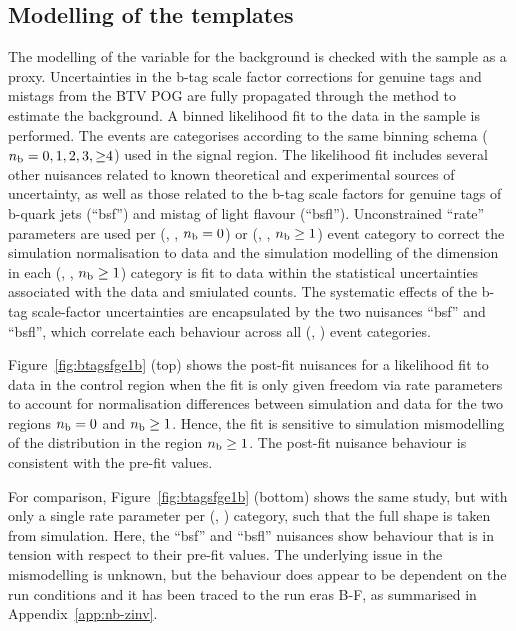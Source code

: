 \subsection{Modelling of the \texorpdfstring{\nb}{Nb} templates}
\label{sec:nb-zinv}

The modelling of the \nb variable for the \znunuj background is
checked with the \mmj sample as a proxy. Uncertainties in the b-tag
scale factor corrections for genuine tags and mistags from the BTV POG
are fully propagated through the method to estimate the \znunuj
background. A binned likelihood fit to the data in the \mmj sample is
performed. The events are categorises according to the same \nb
binning schema ($n_{\text{b}} = 0, 1, 2, 3, {\geq}4$) used in the signal
region. The likelihood fit includes several other nuisances related to
known theoretical and experimental sources of uncertainty, as well as
those related to the b-tag scale factors for genuine tags of b-quark
jets (``bsf'') and mistag of light flavour (``bsfl''). Unconstrained
``rate'' parameters are used per (\njet, \scalht, $n_{\text{b}} = 0$) or
(\njet, \scalht, $n_{\text{b}} \geq 1$) event category to correct the
simulation normalisation to data and the simulation modelling of the
\nb dimension in each (\njet, \scalht, $n_{\text{b}} \geq 1$) category is fit
to data within the statistical uncertainties associated with the data
and smiulated counts. The systematic effects of the b-tag scale-factor
uncertainties are encapsulated by the two nuisances ``bsf'' and
``bsfl'', which correlate each behaviour across all (\njet, \scalht)
event categories.

Figure~\ref{fig:btagsfge1b} (top) shows the post-fit nuisances for a
likelihood fit to data in the \mmj control region when the fit is only
given freedom via rate parameters to account for normalisation
differences between simulation and data for the two regions $n_{\text{b}} = 0$
and $n_{\text{b}} \geq 1$. Hence, the fit is sensitive to simulation
mismodelling of the \nb distribution in the region $n_{\text{b}} \geq 1$. The
post-fit nuisance behaviour is consistent with the pre-fit values.

For comparison, Figure~\ref{fig:btagsfge1b} (bottom) shows the same
study, but with only a single rate parameter per (\njet, \scalht)
category, such that the full \nb shape is taken from simulation. Here,
the ``bsf'' and ``bsfl'' nuisances show behaviour that is in tension
with respect to their pre-fit values. The underlying issue in the
mismodelling is unknown, but the behaviour does appear to be dependent
on the run conditions and it has been traced to the run eras B-F, as
summarised in Appendix~\ref{app:nb-zinv}.

